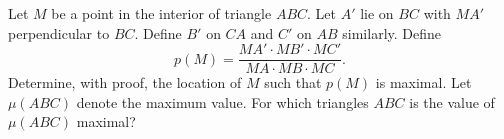 Let $M$ be a point in the interior of triangle $ABC$. Let $A'$ lie on $BC$ with $MA'$ perpendicular to $BC$. Define $B'$ on $CA$ and $C'$ on $AB$ similarly. Define
\[ p(M) = \frac{MA' \cdot MB' \cdot MC'}{MA \cdot MB \cdot MC}. \]
Determine, with proof, the location of $M$ such that $p(M)$ is maximal. Let $\mu(ABC)$ denote the maximum value. For which triangles $ABC$ is the value of $\mu(ABC)$ maximal?
